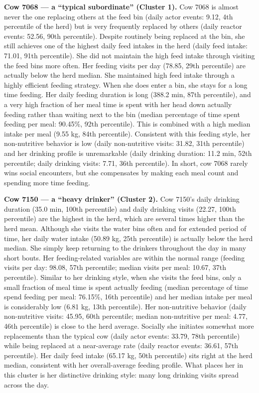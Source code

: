 \documentclass[
]{article}
\begin{document}
\textbf{Cow 7068 --- a ``typical subordinate'' (Cluster 1).} Cow 7068 is
almost never the one replacing others at the feed bin (daily actor
events: 9.12, 4th percentile of the herd) but is very frequently
replaced by others (daily reactor events: 52.56, 90th percentile).
Despite routinely being replaced at the bin, she still achieves one of
the highest daily feed intakes in the herd (daily feed intake: 71.01,
91th percentile). She did not maintain the high feed intake through
visiting the feed bins more often. Her feeding visits per day (78.85,
29th percentile) are actually below the herd median. She maintained high
feed intake through a highly efficient feeding strategy. When she does
enter a bin, she stays for a long time feeding. Her daily feeding
duration is long (388.2 min, 87th percentile), and a very high fraction
of her meal time is spent with her head down actually feeding rather
than waiting next to the bin (median percentage of time spent feeding
per meal: 90.45\%, 92th percentile). This is combined with a high median
intake per meal (9.55 kg, 84th percentile). Consistent with this feeding
style, her non-nutritive behavior is low (daily non-nutritive visits:
31.82, 31th percentile) and her drinking profile is unremarkable (daily
drinking duration: 11.2 min, 52th percentile; daily drinking visits:
7.71, 36th percentile). In short, cow 7068 rarely wins social
encounters, but she compensates by making each meal count and spending
more time feeding.

\textbf{Cow 7150 --- a ``heavy drinker'' (Cluster 2).} Cow 7150's daily
drinking duration (35.0 min, 100th percentile) and daily drinking visits
(22.27, 100th percentile) are the highest in the herd, which are several
times higher than the herd mean. Although she visits the water bins
often and for extended period of time, her daily water intake (50.89 kg,
25th percentile) is actually below the herd median. She simply keep
returning to the drinkers throughout the day in many short bouts. Her
feeding-related variables are within the normal range (feeding visits
per day: 98.08, 57th percentile; median visits per meal: 10.67, 37th
percentile). Similar to her drinking style, when she visits the feed
bins, only a small fraction of meal time is spent actually feeding
(median percentage of time spend feeding per meal: 76.15\%, 16th
percentile) and her median intake per meal is considerably low (6.81 kg,
13th percentile). Her non-nutritive behavior (daily non-nutritive
visits: 45.95, 60th percentile; median non-nutritive per meal: 4.77,
46th percentile) is close to the herd average. Socially she initiates
somewhat more replacements than the typical cow (daily actor events:
33.79, 78th percentile) while being replaced at a near-average rate
(daily reactor events: 36.61, 57th percentile). Her daily feed intake
(65.17 kg, 50th percentile) sits right at the herd median, consistent
with her overall-average feeding profile. What places her in this
cluster is her distinctive drinking style: many long drinking visits
spread across the day.
\end{document}
